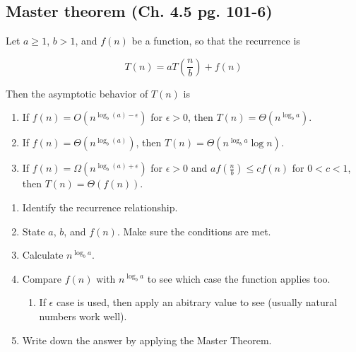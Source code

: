 \subsection{Master theorem (Ch. 4.5 pg. 101-6)}
    \begin{theorem}
        Let \( a \geq 1 \), \( b > 1 \), and \( f(n) \) be a function, so that the recurrence is 

        \begin{equation}
            T(n) = aT\left(\frac{n}{b}\right) + f(n)
        \end{equation}

        Then the asymptotic behavior of \( T(n) \) is
        \begin{enumerate}
            \item If \( f(n) = O\left(n^{\log_b (a) - \epsilon}\right) \) for \( \epsilon > 0 \), then \( T(n) = \Theta\left(n^{\log_b a}\right) \).
            
            \item If \( f(n) = \Theta\left(n^{\log_b (a)}\right) \), then \( T(n) = \Theta\left(n^{\log_b a} \log n\right) \).
            
            \item If \( f(n) = \Omega\left(n^{\log_b (a) + \epsilon}\right) \) for \( \epsilon > 0 \) and \( af\left(\frac{n}{b}\right) \leq cf(n) \) for \( 0 < c < 1 \), then \( T(n) = \Theta(f(n)) \).
        \end{enumerate}
    \end{theorem}

    \begin{process}
        \begin{enumerate}
            \item Identify the recurrence relationship.
            \item State $a$, $b$, and $f(n)$. Make sure the conditions are met.
            \item Calculate $n^{\log_b a}$. 
            \item Compare $f(n)$ with $n^{\log_b a}$ to see which case the function applies too.
            \begin{enumerate}
                \item If $\epsilon$ case is used, then apply an abitrary value to see (usually natural numbers work well).
            \end{enumerate}
            \item Write down the answer by applying the Master Theorem.
        \end{enumerate}
    \end{process}
    
